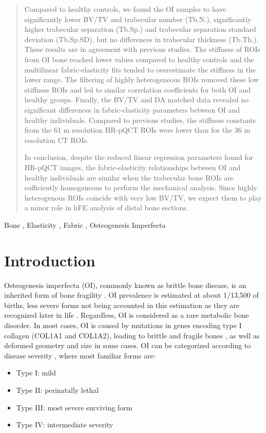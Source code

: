\documentclass[a4paper,fleqn]{DC_ArtStyle}
\begin{document}
\begin{abstract}
		Compared to healthy controls, we found the OI samples to have significantly lower BV/TV and trabecular number (Tb.N.), significantly higher trabecular separation (Tb.Sp.) and trabecular separation standard deviation (Tb.Sp.SD), but no differences in trabecular thickness (Tb.Th.). These results are in agreement with previous studies. The stiffness of ROIs from OI bone reached lower values compared to healthy controls and the multilinear fabric-elasticity fits tended to overestimate the stiffness in the lower range. The filtering of highly heterogeneous ROIs removed these low stiffness ROIs and led to similar correlation coefficients for both OI and healthy groups. Finally, the BV/TV and DA matched data revealed no significant differences in fabric-elasticity parameters between OI and healthy individuals. Compared to previous studies, the stiffness constants from the 61 \si{\micro}m resolution HR-pQCT ROIs were lower than for the 36 \si{\micro}m resolution \si{\micro}CT ROIs.
		
		In conclusion, despite the reduced linear regression parameters found for HR-pQCT images, the fabric-elasticity relationships between OI and healthy individuals are similar when the trabecular bone ROIs are sufficiently homogeneous to perform the mechanical analysis. Since highly heterogenous ROIs coincide with very low BV/TV, we expect them to play a minor role in hFE analysis of distal bone sections.
	\end{abstract}
	
	\begin{keywords}
		Bone \sep
		Elasticity \sep
		Fabric \sep
		Osteogenesis Imperfecta
	\end{keywords}
	
	
	\maketitle
	
	\section{Introduction}
	
	Osteogenesis imperfecta (OI), commonly known as brittle bone disease, is an inherited form of bone fragility \cite{Tournis2018}. OI prevalence is estimated at about  1/13,500 of births, less severe forms not being accounted in this estimation as they are recognized later in life \cite{Lindahl2015}. Regardless, OI is considered as a rare metabolic bone disorder. In most cases, OI is caused by mutations in genes encoding type I collagen (COL1A1 and COL1A2), leading to brittle and fragile bones \cite{LIM2017}, as well as deformed geometry and size in some cases. OI can be categorized according to disease severity \cite{Mortier2019}, where most familiar forms are:
	\begin{itemize}
		\item Type I: mild
		\item Type II: perinatally lethal
		\item Type III: most severe surviving form
		\item Type IV: intermediate severity
	\end{itemize}
	
\end{document}
